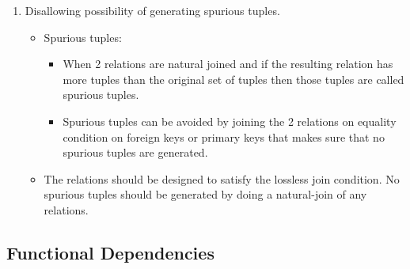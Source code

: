 \documentclass[10pt]{article}
\begin{document}
\begin{enumerate}
	\item Disallowing possibility of generating spurious tuples. 
	
	\begin{itemize}
		\item Spurious tuples:
		
		\begin{itemize}
			\item When 2 relations are natural joined and if the resulting relation has more tuples than the original set of tuples then those tuples are called spurious tuples.
			\item Spurious tuples can be avoided by joining the 2 relations on equality condition on foreign keys or primary keys that makes sure that no spurious tuples are generated.
		\end{itemize}

		\item The relations should be designed to satisfy the lossless join condition. No spurious tuples should be generated by doing a natural-join of any relations.
	\end{itemize}
\end{enumerate}

\subsection{Functional Dependencies}
\end{document}

